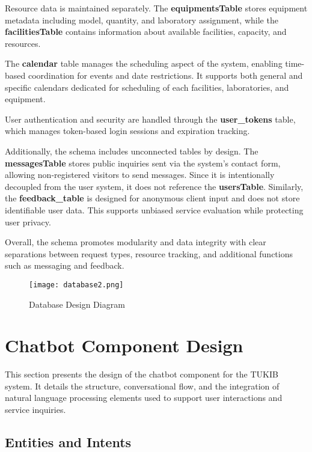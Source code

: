 Resource data is maintained separately. The \textbf{equipmentsTable} stores equipment metadata including model, quantity, and laboratory assignment, while the \textbf{facilitiesTable} contains information about available facilities, capacity, and resources. 

The \textbf{calendar} table manages the scheduling aspect of the system, enabling time-based coordination for events and date restrictions. It supports both general and specific calendars dedicated for scheduling of each facilities, laboratories, and equipment.

User authentication and security are handled through the \textbf{user\_tokens} table, which manages token-based login sessions and expiration tracking.

Additionally, the schema includes unconnected tables by design. The \textbf{messagesTable} stores public inquiries sent via the system's contact form, allowing non-registered visitors to send messages. Since it is intentionally decoupled from the user system, it does not reference the \textbf{usersTable}. Similarly, the \textbf{feedback\_table} is designed for anonymous client input and does not store identifiable user data. This supports unbiased service evaluation while protecting user privacy.

Overall, the schema promotes modularity and data integrity with clear separations between request types, resource tracking, and additional functions such as messaging and feedback.

\newpage

\begin{figure}[h]
	\centering 
	\texttt{[image: database2.png]}
	\caption{Database Design Diagram}
	\label{fig:database}
\end{figure}

\section{Chatbot Component Design}
This section presents the design of the chatbot component for the TUKIB system. It details the structure, conversational flow, and the integration of natural language processing elements used to support user interactions and service inquiries.

\subsection{Entities and Intents}

